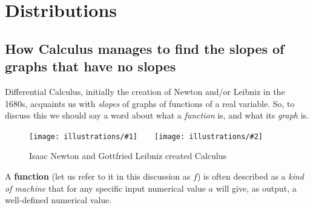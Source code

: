\documentclass[openany]{book}
\newcommand{\illtwo}[4]{%
   \begin{figure}[H]\centering%
   \texttt{[image: illustrations/\#1]}$\qquad$\texttt{[image: illustrations/\#2]}%
   \caption{#4}%
    \end{figure}}
\theoremstyle{plain}
\theoremstyle{definition}
\newcommand{\RH}{Riemann Hypothesis\index{Riemann Hypothesis}}
\begin{document}
{{%






\part{Distributions\label{part2}}


\chapter[Slopes of graphs that have no slopes]{How Calculus manages to
  find the slopes of graphs that have no slopes}

Differential Calculus, initially the creation of Newton and/or Leibniz
in the 1680s, acquaints us with {\it slopes} of graphs of functions of
a real variable.  So, to discuss this we should say a word about what
a {\it function} is, and what its {\it graph} is.

 \illtwo{newton}{leibniz}{0.25}{Isaac Newton and Gottfried Leibniz created Calculus}


 A {\bf function} (let us refer to it in this discussion as $f$) is
 often described as a {\it kind of machine} that for any specific
 input numerical value $a$ will give, as output, a well-defined
 numerical value.

}}
\end{document}
